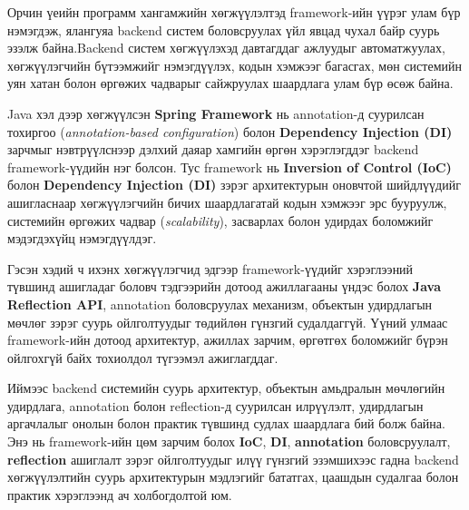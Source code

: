 
Орчин үеийн программ хангамжийн хөгжүүлэлтэд framework-ийн үүрэг улам бүр нэмэгдэж, ялангуяа backend систем боловсруулах үйл явцад чухал байр суурь эзэлж байна.Backend систем хөгжүүлэхэд давтагддаг ажлуудыг автоматжуулах, хөгжүүлэгчийн бүтээмжийг нэмэгдүүлэх, кодын хэмжээг багасгах, мөн системийн уян хатан болон өргөжих чадварыг сайжруулах шаардлага улам бүр өсөж байна.

Java хэл дээр хөгжүүлсэн \textbf{Spring Framework} нь annotation-д суурилсан тохиргоо (\textit{annotation-based configuration}) болон \textbf{Dependency Injection (DI)} зарчмыг нэвтрүүлснээр дэлхий даяар хамгийн өргөн хэрэглэгддэг backend framework-үүдийн нэг болсон. Тус framework нь \textbf{Inversion of Control (IoC)} болон \textbf{Dependency Injection (DI)} зэрэг архитектурын оновчтой шийдлүүдийг ашигласнаар хөгжүүлэгчийн бичих шаардлагатай кодын хэмжээг эрс бууруулж, системийн өргөжих чадвар (\textit{scalability}), засварлах болон удирдах боломжийг мэдэгдэхүйц нэмэгдүүлдэг.

Гэсэн хэдий ч ихэнх хөгжүүлэгчид эдгээр framework-үүдийг хэрэглээний түвшинд ашигладаг боловч тэдгээрийн дотоод ажиллагааны үндэс болох \textbf{Java Reflection API}, annotation боловсруулах механизм, объектын удирдлагын мөчлөг зэрэг суурь ойлголтуудыг төдийлөн гүнзгий судалдаггүй. Үүний улмаас framework-ийн дотоод архитектур, ажиллах зарчим, өргөтгөх боломжийг бүрэн ойлгохгүй байх тохиолдол түгээмэл ажиглагддаг.

Иймээс backend системийн суурь архитектур, объектын амьдралын мөчлөгийн удирдлага, annotation болон reflection-д суурилсан илрүүлэлт, удирдлагын аргачлалыг онолын болон практик түвшинд судлах шаардлага бий болж байна. Энэ нь framework-ийн цөм зарчим болох \textbf{IoC}, \textbf{DI}, \textbf{annotation} боловсруулалт, \textbf{reflection} ашиглалт зэрэг ойлголтуудыг илүү гүнзгий эзэмшихээс гадна backend хөгжүүлэлтийн суурь архитектурын мэдлэгийг бататгах, цаашдын судалгаа болон практик хэрэглээнд ач холбогдолтой юм.

